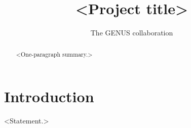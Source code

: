 \documentclass[11pt]{article}
\title{<Project title>}
\author{The GENUS collaboration}
\begin{document}
\maketitle
\genusdisclaimer

\begin{abstract}
<One-paragraph summary.>
\end{abstract}

\section{Introduction}

\begin{conjecture}
<Statement.>
\end{conjecture}
\end{document}

